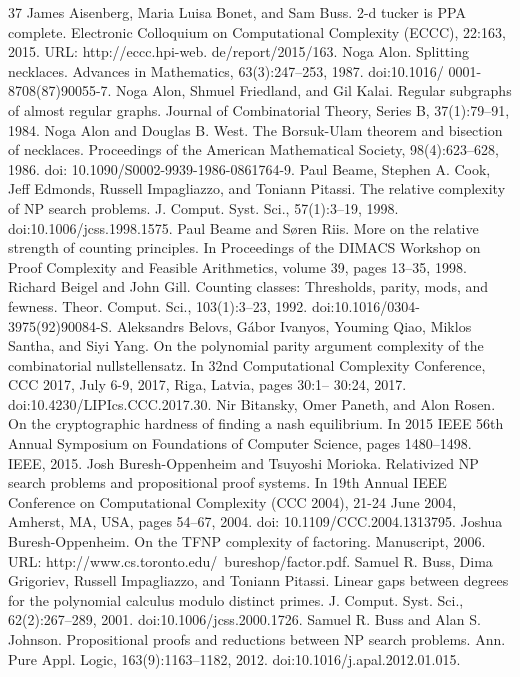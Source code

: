 \documentclass[10pt,a4paper]{article}
\theoremstyle{definition}
\theoremstyle{remark}
\begin{document}
\begin{thebibliography}{37}
 James Aisenberg, Maria Luisa Bonet, and Sam Buss. 2-d tucker is PPA complete. Electronic Colloquium on Computational Complexity (ECCC), 22:163, 2015. URL: http://eccc.hpi-web. de/report/2015/163.
 Noga Alon. Splitting necklaces. Advances in Mathematics, 63(3):247–253, 1987. doi:10.1016/ 0001-8708(87)90055-7.
 Noga Alon, Shmuel Friedland, and Gil Kalai. Regular subgraphs of almost regular graphs. Journal of Combinatorial Theory, Series B, 37(1):79–91, 1984.
 Noga Alon and Douglas B. West. The Borsuk-Ulam theorem and bisection of necklaces. Proceedings of the American Mathematical Society, 98(4):623–628, 1986. doi: 10.1090/S0002-9939-1986-0861764-9.
 Paul Beame, Stephen A. Cook, Jeff Edmonds, Russell Impagliazzo, and Toniann Pitassi. The relative complexity of NP search problems. J. Comput. Syst. Sci., 57(1):3–19, 1998. doi:10.1006/jcss.1998.1575.
 Paul Beame and Søren Riis. More on the relative strength of counting principles. In Proceedings of the DIMACS Workshop on Proof Complexity and Feasible Arithmetics, volume 39, pages 13–35, 1998.
 Richard Beigel and John Gill. Counting classes: Thresholds, parity, mods, and fewness. Theor. Comput. Sci., 103(1):3–23, 1992. doi:10.1016/0304-3975(92)90084-S.
 Aleksandrs Belovs, Gábor Ivanyos, Youming Qiao, Miklos Santha, and Siyi Yang. On the polynomial parity argument complexity of the combinatorial nullstellensatz. In 32nd Computational Complexity Conference, CCC 2017, July 6-9, 2017, Riga, Latvia, pages 30:1– 30:24, 2017. doi:10.4230/LIPIcs.CCC.2017.30.
 Nir Bitansky, Omer Paneth, and Alon Rosen. On the cryptographic hardness of finding a nash equilibrium. In 2015 IEEE 56th Annual Symposium on Foundations of Computer Science, pages 1480–1498. IEEE, 2015.
 Josh Buresh-Oppenheim and Tsuyoshi Morioka. Relativized NP search problems and propositional proof systems. In 19th Annual IEEE Conference on Computational Complexity (CCC 2004), 21-24 June 2004, Amherst, MA, USA, pages 54–67, 2004. doi: 10.1109/CCC.2004.1313795.
 Joshua Buresh-Oppenheim. On the TFNP complexity of factoring. Manuscript, 2006. URL: http://www.cs.toronto.edu/~bureshop/factor.pdf.
 Samuel R. Buss, Dima Grigoriev, Russell Impagliazzo, and Toniann Pitassi. Linear gaps between degrees for the polynomial calculus modulo distinct primes. J. Comput. Syst. Sci., 62(2):267–289, 2001. doi:10.1006/jcss.2000.1726.
 Samuel R. Buss and Alan S. Johnson. Propositional proofs and reductions between NP search problems. Ann. Pure Appl. Logic, 163(9):1163–1182, 2012. doi:10.1016/j.apal.2012.01.015.

\end{thebibliography}
\end{document}
